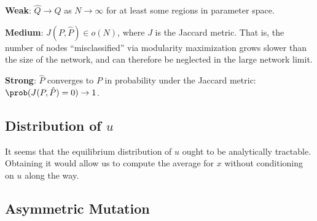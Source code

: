 \documentclass[english]{scrartcl}
\begin{document}
		\begin{conj}
			\textbf{Weak}: $\hat{Q} \rightarrow Q$ as $N \rightarrow \infty$ for at least some regions in parameter space.  
		\end{conj}

		\begin{conj}
			\textbf{Medium}: $J(P, \hat{P}) \in o(N)$, where $J$ is the Jaccard metric. That is, the number of nodes ``misclassified'' via modularity maximization grows slower than the size of the network, and can therefore be neglected in the large network limit. 
		\end{conj}

		\begin{conj}
			\textbf{Strong}: $\hat{P}$ converges to $P$ in probability under the Jaccard metric: $\prob(J(P, \hat{P}) = 0) \rightarrow 1$.
		\end{conj}

	\subsection{Distribution of $u$}
		It seems that the equilibrium distribution of $u$ ought to be analytically tractable. Obtaining it would allow us to compute the average for $x$ without conditioning on $u$ along the way. 
	\subsection{Asymmetric Mutation}
\end{document}
